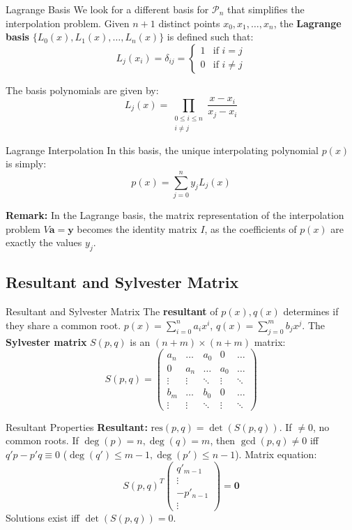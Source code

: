\documentclass{beamer}
\begin{document}
\begin{frame}{Lagrange Basis}
    We look for a different basis for $\mathcal{P}_n$ that simplifies the interpolation problem. Given $n+1$ distinct points $x_0, x_1, \dots, x_n$, the \textbf{Lagrange basis} $\{L_0(x), L_1(x), \dots, L_n(x)\}$ is defined such that:
    \[L_j(x_i) = \delta_{ij} = \begin{cases} 1 & \text{if } i = j \\ 0 & \text{if } i \neq j \end{cases}\]

    The basis polynomials are given by:
    \[L_j(x) = \prod_{\substack{0 \le i \le n \\ i \neq j}} \frac{x - x_i}{x_j - x_i}\]
\end{frame}

\begin{frame}{Lagrange Interpolation}
    In this basis, the unique interpolating polynomial $p(x)$ is simply:
    \[p(x) = \sum_{j=0}^n y_j L_j(x)\]

    \textbf{Remark:} In the Lagrange basis, the matrix representation of the interpolation problem $V\mathbf{a} = \mathbf{y}$ becomes the identity matrix $I$, as the coefficients of $p(x)$ are exactly the values $y_j$.
\end{frame}
\begin{frame}{}
\end{frame}

\subsection{Resultant and Sylvester Matrix}
\begin{frame}{Resultant and Sylvester Matrix}
    The \textbf{resultant} of $p(x), q(x)$ determines if they share a common root.
    $p(x) = \sum_{i=0}^n a_i x^i$, $q(x) = \sum_{j=0}^m b_j x^j$.
    The \textbf{Sylvester matrix} $S(p, q)$ is an $(n+m) \times (n+m)$ matrix:
    \[ S(p, q) = \begin{pmatrix} a_n & \dots & a_0 & 0 & \dots \\ 0 & a_n & \dots & a_0 & \dots \\ \vdots & \vdots & \ddots & \vdots & \ddots \\ b_m & \dots & b_0 & 0 & \dots \\ \vdots & \vdots & \ddots & \vdots & \ddots \end{pmatrix} \]
\end{frame}

\begin{frame}{Resultant Properties}
    \textbf{Resultant:} $\text{res}(p, q) = \det(S(p, q))$. If $\neq 0$, no common roots.
    \vfill
    If $\deg(p)=n, \deg(q)=m$, then $\gcd(p,q) \neq 0$ iff $q'p - p'q \equiv 0$ ($\deg(q')\le m-1, \deg(p')\le n-1$).
    \vfill
    Matrix equation:
    \[ S(p, q)^T \begin{pmatrix} q'_{m-1} \\ \vdots \\ -p'_{n-1} \\ \vdots \end{pmatrix} = \mathbf{0} \]
    Solutions exist iff $\det(S(p, q)) = 0$.
\end{frame}
\end{document}
